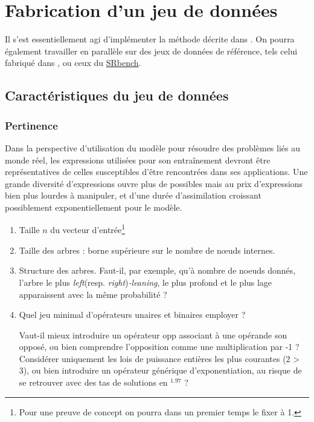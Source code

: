 \documentclass[a4paper,12pt]{article}
\begin{document}
\section{Fabrication d'un jeu de données}

Il s'est essentiellement agi d'implémenter la méthode décrite dans \cite{lample}.
On pourra également travailler en parallèle sur des jeux de données de référence, tels celui fabriqué dans \cite{udrescu}, ou ceux du \href{https://cavalab.org/srbench/}{SRbench}.

\subsection{Caractéristiques du jeu de données}
\label{sec:carac}

\subsubsection{{\color{orange}Pertinence}}
\label{sec:pert}

Dans la perspective d'utilisation du modèle pour résoudre des problèmes liés au monde réel, les expressions utilisées pour son entraînement devront être représentatives de celles susceptibles d'être rencontrées dans ses applications. Une grande diversité d'expressions ouvre plus de possibles mais au prix d'expressions bien plus lourdes à manipuler, et d'une durée d'assimilation croissant possiblement exponentiellement pour le modèle.

\begin{enumerate}

\item Taille $n$ du vecteur d'entrée\footnote{Pour une preuve de concept on pourra dans un premier temps le fixer à 1.}

\item Taille des arbres : borne supérieure sur le nombre de nœuds internes.

\item Structure des arbres. Faut-il, par exemple, qu'à nombre de noeuds donnés, l'arbre le plus \emph{left}(resp. \emph{right})\emph{-leaning}, le plus profond et le plus lage apparaissent avec la même probabilité ?

\item Quel jeu minimal d'opérateurs unaires et binaires employer ?

Vaut-il mieux introduire un opérateur $\text{opp}$ associant à une opérande son opposé, ou bien comprendre l'opposition comme une multiplication par -1 ? Considérer uniquement les lois de puissance entières les plus courantes (2 > 3), ou bien introduire un opérateur générique d'exponentiation, au risque de se retrouver avec des tas de solutions en $^{1.97}$ ?
\end{enumerate}
\end{document}
